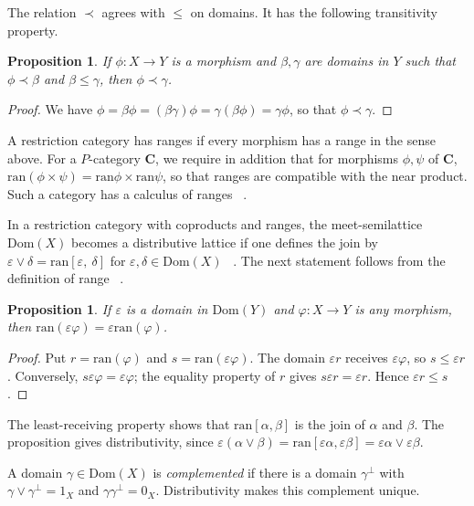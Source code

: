 \documentclass[letterpaper,10pt]{amsart}
\theoremstyle{plain}
\newtheorem{prop}[thm]{Proposition}
\theoremstyle{definition}
\newcommand{\MAP}[3]{{#1}:{#2}\rightarrow{#3}}
\begin{document}
The relation $\prec$ agrees with $\le$ on domains. It has the following transitivity property.

\begin{prop}\label{PropRec}
If $\MAP{\phi}{X}{Y}$ is a morphism and $\beta,\gamma$ are domains
in $Y$ such that $\phi\prec\beta$ and $\beta\le\gamma$, then
$\phi\prec\gamma$.
\end{prop}
\begin{proof}
We have
$\phi=\beta\phi=(\beta\gamma)\phi=\gamma(\beta\phi)=\gamma\phi$,
so that $\phi\prec\gamma$. 
\end{proof}

A restriction category has ranges if every morphism has a range in the sense above.
For a $P$-category $\mathbf C$, we require in addition that
for morphisms $\phi,\psi$ of $\mathbf{C}$,
$\mathrm{ran}(\phi\times\psi)=\mathrm{ran}\phi\times\mathrm{ran}\psi$,
so that ranges are compatible with the near product. Such a category has a calculus of ranges
~\cite{MR92e:03067,MR88i:03078}. 

In a restriction category with coproducts and
ranges, the meet-semilattice $\mathrm{Dom}(X)$ becomes a
distributive lattice if one defines the join by
$\varepsilon\vee\delta=\mathrm{ran}[\varepsilon,\ \delta]$ for
$\varepsilon,\delta\in\mathrm{Dom}(X)$
~\cite{MR88i:03078,MR92e:03067}. The next statement follows
from the definition of range ~\cite[Proposition
5.4]{MR88i:03078}.

\begin{prop}\label{PropDomRan}
If $\varepsilon$ is a domain in $\mathrm{Dom}(Y)$ and
$\MAP{\varphi}{X}{Y}$ is any morphism, then
$\mathrm{ran}(\varepsilon\varphi)=\varepsilon
\mathrm{ran}(\varphi)$.
\end{prop}
\begin{proof}
Put $r=\mathrm{ran}(\varphi)$ and $s=\mathrm{ran}(\varepsilon\varphi)$.
The domain $\varepsilon r$ receives $\varepsilon\varphi$, so
$s\le\varepsilon r$. Conversely, $s\varepsilon\varphi=\varepsilon\varphi$;
the equality property of $r$ gives $s\varepsilon r=\varepsilon r$.
Hence $\varepsilon r\le s$.
\end{proof}

The least-receiving property shows that
$\mathrm{ran}[\alpha,\beta]$ is the join of $\alpha$ and $\beta$.
The proposition gives distributivity, since
$\varepsilon(\alpha\vee\beta)=\mathrm{ran}[\varepsilon\alpha,
\varepsilon\beta]=\varepsilon\alpha\vee\varepsilon\beta$.

A domain $\gamma\in\mathrm{Dom}(X)$ is \textit{complemented} if
there is a domain $\gamma^\perp$ with
$\gamma\vee\gamma^\perp=1_X$ and $\gamma\gamma^\perp=0_X$.
Distributivity makes this complement unique.
\end{document}
